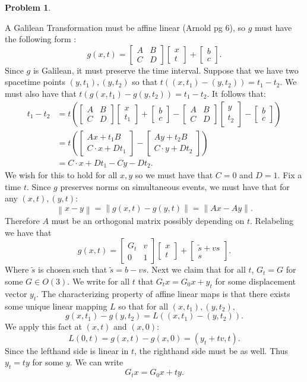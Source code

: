 \documentclass[12pt, a4paper]{article}
\title{}
\author{A.N.}
\date{\today}
\newtheorem{problem}{Problem}
\theoremstyle{definition}
\newcommand{\norm}[1]{\left\lVert#1\right\rVert}
\newcommand{\bmat}[1]{\begin{bmatrix}#1\end{bmatrix}}
\begin{document}
\begin{problem}
\end{problem}
A Galilean Transformation must be affine linear (Arnold pg 6), so $g$ must have the following form : 
$$g(x,t) = \bmat{A & B \\ C  & D} \bmat{x \\ t} + \bmat{b\\c }.$$ 
Since $g$ is Galilean, it must preserve the time interval. Suppose that we have two spacetime  points $(y,t_1), (y,t_2)$ so that $t( (x,t_1) -(y,t_2)  ) = t_1 - t_2$. We must also have that $t(g(x,t_1) - g(y, t_2)) = t_1 - t_2$. It follows that:
\begin{align*}t_1 - t_2 & = t \left( \bmat{A & B \\ C  & D} \bmat{x \\ t_1 } + \bmat{b\\c }  - \bmat{A & B \\ C  & D} \bmat{y \\ t_2} - \bmat{b\\c }\right)
	\\ & = t\left( \bmat{A x + t_1 B \\ C \cdot x + D t_1} - \bmat{A y + t_2 B \\ C \cdot y + D t_2} \right) 
	\\ & =C \cdot x + D t_1 - C y- D t_2.
\end{align*}
We wish for this to hold for all $x,y$  so we must have that $C = 0$ and $D = 1$. Fix a time $t$. Since $g$ preserves norms on simultaneous events, we must have that for any $(x,t), (y,t)$:
$$\norm{x- y} = \norm{g(x,t) - g(y,t)} = \norm{Ax - A y}.$$
Therefore $A$ must be an orthogonal matrix possibly depending on $t$. Relabeling we have that 
$$g(x,t) = \bmat{G_t & v \\ 0 & 1 } \bmat{x\\t} + \bmat{ \tilde{s} + vs \\ s}. $$ 
Where $\tilde{s}$ is chosen such that $\tilde{s} = b - vs$. Next we claim that for all $t$, $G_t = G$ for some $G\in O(3)$. We write for all $t$ that $G_t x = G_0x + y_t$ for some displacement vector $y_t$. The characterizing property of affine linear maps is that there exists some unique linear mapping $L$ so that for all $(x,t_1), (y,t_2)$, 
$$g(x,t_1) - g(y,t_2) = L \left((x,t_1) - (y,t_2) \right).$$
We apply this fact at $(x,t)$ and $(x,0)$:
$$L(0,t) = g(x,t) - g(x,0) = (y_t + tv , t).$$
Since the lefthand side is linear in $t$, the righthand side must be as well. Thus $y_t = ty$ for some $y$. We can write $$G_tx = G_0 x + ty.$$
\end{document}
